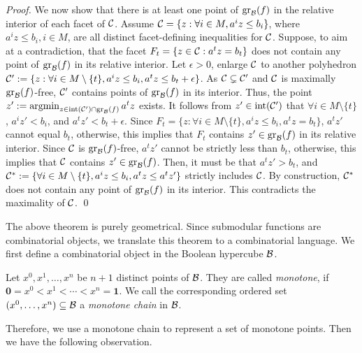 \begin{proof}
We now show that there is at least one point of  $\operatorname{gr}_{\mathcal B}(f)$ in the relative interior of each facet of $\mathcal C$. Assume $\mathcal C = \{z:\forall i \in M, a^i z \le b_i\}$, where $a^i z \le b_i, i \in M$, are all distinct facet-defining inequalities for $\mathcal C$. Suppose, to aim at a contradiction, that the facet $F_t = \{z \in \mathcal C: a^t z=b_t\}$ does not contain any point of $\operatorname{gr}_{\mathcal B}(f)$ in its relative interior.  Let $\epsilon > 0$, enlarge $\mathcal C$ to another polyhedron $\mathcal C':= \{z:\forall i \in M \setminus \{t\}, a^i z \le b_i, a^t z \le b_t + \epsilon\}$. As $\mathcal C \subsetneq \mathcal C'$ and $\mathcal C$ is maximally $\operatorname{gr}_{\mathcal B}(f)$-free, $\mathcal C'$ contains points of  $\operatorname{gr}_{\mathcal B}(f)$ in its interior.  Thus,
the point $z' := \operatorname{argmin}_{z \in \operatorname{int}(\mathcal C') \cap \operatorname{gr}_{\mathcal B}(f)} a^t z $ exists. It follows from $z' \in \operatorname{int}(\mathcal C')$ that $\forall i \in M \setminus \{t\}$, $a^i z' < b_i$, and $a^t z' < b_t + \epsilon$. Since  $F_t = \{z:\forall i \in M \setminus \{t\}, a^i z \le b_i, a^t z = b_t\}$, $a^t z'$ cannot  equal $b_t$, otherwise, this implies that $F_t$ contains $z' \in \operatorname{gr}_{\mathcal B}(f)$ in its relative interior. Since $\mathcal C$ is $\operatorname{gr}_{\mathcal B}(f)$-free, $a^t z'$ cannot be strictly less than $b_t$, otherwise, this implies that $\mathcal C$ contains $z' \in \operatorname{gr}_{\mathcal B}(f)$. Then, it must be that $a^t z' > b_t$, and $\mathcal C^{*}:=\{\forall i \in M \setminus \{t\}, a^i z \le b_i, a^t z \le a^t z'\}$ strictly includes $\mathcal C$.  By construction,  $\mathcal C^{*}$  does not contain any point of $\operatorname{gr}_{\mathcal B}(f)$ in its interior. This contradicts the maximality of $\mathcal C$. \qed
\end{proof}




The above theorem is purely geometrical. Since submodular functions are combinatorial objects, we translate this theorem to a combinatorial language. We first define a combinatorial object in the Boolean hypercube $\mathcal B$.


\begin{definition}
Let $x^0, x^1,  \dots, x^n$ be $n+1$ distinct points of $\mathcal B$.  They are called  \textit{monotone}, if $\mathbf{0} = x^0 < x^1 < \cdots < x^n = \mathbf{1} $.  We call the corresponding ordered set $(x^0, \dots, x^n) \subseteq \mathcal B$  a \textit{monotone chain} in $\mathcal B$.
\end{definition}

 Therefore,  we use a monotone chain to represent a set of monotone points. Then  we have the following observation.


